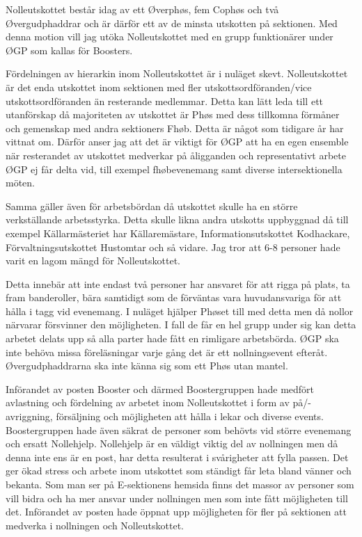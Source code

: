 \documentclass[../_main/handlingar.tex]{subfiles}
\begin{document}

Nolleutskottet består idag av ett Øverphøs, fem Cophøs och två Øvergudphaddrar och är därför ett av de minsta utskotten på sektionen. Med denna motion vill jag utöka Nolleutskottet med en grupp funktionärer under ØGP som kallas för Boosters.

Fördelningen av hierarkin inom Nolleutskottet är i nuläget skevt. Nolleutskottet är det enda utskottet inom sektionen med fler utskottsordföranden/vice utskottsordföranden än resterande medlemmar. Detta kan lätt leda till ett utanförskap då majoriteten av utskottet är Phøs med dess tillkomna förmåner och gemenskap med andra sektioners Fhøb. Detta är något som tidigare år har vittnat om. Därför anser jag att det är viktigt för ØGP att ha en egen ensemble när resterandet av utskottet medverkar på åligganden och representativt arbete ØGP ej får delta vid, till exempel fhøbevenemang samt diverse intersektionella möten.

Samma gäller även för arbetsbördan då utskottet skulle ha en större verkställande arbetsstyrka. Detta skulle likna andra utskotts uppbyggnad då till exempel Källarmästeriet har Källaremästare, Informationsutskottet Kodhackare, Förvaltningsutskottet Hustomtar och så vidare. Jag tror att 6-8 personer hade varit en lagom mängd för Nolleutskottet.

Detta innebär att inte endast två personer har ansvaret för att rigga på plats, ta fram banderoller, bära  samtidigt som de förväntas vara huvudansvariga för att hålla i tagg vid evenemang. 
I nuläget hjälper Phøset till med detta men då nollor närvarar försvinner den möjligheten. I fall de får en hel grupp under sig kan detta arbetet delats upp så alla parter hade fått en rimligare arbetsbörda. ØGP ska inte behöva missa föreläsningar varje gång det är ett nollningsevent efteråt.
Øvergudphaddrarna ska inte känna sig som ett Phøs utan mantel.

Införandet av posten Booster och därmed Boostergruppen hade medfört avlastning och fördelning av arbetet inom Nolleutskottet i form av på/-avriggning, försäljning och möjligheten att hålla i lekar och diverse events. Boostergruppen hade även säkrat de personer som behövts vid större evenemang och ersatt Nollehjelp. Nollehjelp är en väldigt viktig del av nollningen men då denna inte ens är en post, har detta resulterat i svårigheter att fylla passen. Det ger ökad stress och arbete inom utskottet som ständigt får leta bland vänner och bekanta. Som man ser på E-sektionens hemsida finns det massor av personer som vill bidra och ha mer ansvar under nollningen men som inte fått möjligheten till det. Införandet av posten hade öppnat upp möjligheten för fler på sektionen att medverka i nollningen och Nolleutskottet.
\end{document}
